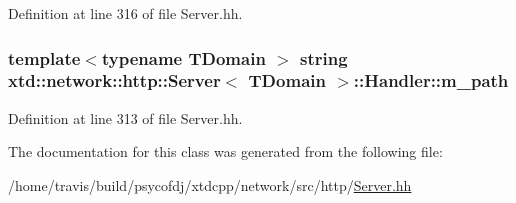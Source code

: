 Definition at line 316 of file Server.\-hh.

\hypertarget{classxtd_1_1network_1_1http_1_1Server_1_1Handler_a5626894a7be78f8f77879973199973ea}{
\subsubsection[{m\-\_\-path}]{\setlength{\rightskip}{0pt plus 5cm}template$<$typename T\-Domain $>$ string {\bf xtd\-::network\-::http\-::\-Server}$<$ T\-Domain $>$\-::Handler\-::m\-\_\-path}}\label{classxtd_1_1network_1_1http_1_1Server_1_1Handler_a5626894a7be78f8f77879973199973ea}


Definition at line 313 of file Server.\-hh.



The documentation for this class was generated from the following file\-:\begin{DoxyCompactItemize}
\item 
/home/travis/build/psycofdj/xtdcpp/network/src/http/\hyperlink{http_2Server_8hh}{Server.\-hh}\end{DoxyCompactItemize}
